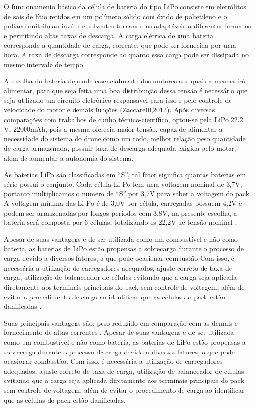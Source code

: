 
O funcionamento básico da célula de bateria do tipo LiPo consiste em eletrólitos de sais de lítio retidos
em um polímero sólido com óxido de polietileno e o poliacrilonitrilo ao invés de solventes tornando-as
adaptáveis a diferentes formatos e permitindo altas taxas de descarga. A carga elétrica de uma bateria
corresponde a quantidade de carga, corrente, que pode ser fornecida por uma hora. 
A taxa de descarga corresponde ao quanto essa carga pode ser dissipada no mesmo intervalo de tempo. \cite{gibbs}

A escolha da bateria depende essencialmente dos motores aos quais a mesma irá alimentar, para que seja feita uma boa distribuição dessa tensão é necessário que seja utilizado um circuito eletrônico responsável para isso e pelo controle de velocidade do motor e demais funções (Zaccarelli,2012). Após diversas comparações com trabalhos de cunho técnico-científico, optou-se pela  LiPo 22.2 V, 22000mAh, pois a mesma oferecia maior tensão, capaz de alimentar a necessidade do sistema do drone como um todo, melhor relação peso quantidade de carga armazenada, possuir taxa de descarga adequada exigida pelo motor, além de aumentar a autonomia do sistema.

As baterias LiPo são classificadas em “S”, tal fator significa quantas baterias em série possui o conjunto. Cada célula Li-Po tem uma voltagem nominal de 3,7V, portanto multiplicamos o numero de “S” por 3,7V para saber a voltagem do pack.  A voltagem mínima das Li-Po é de 3,0V por célula, carregadas possuem 4,2V e podem ser armazenadas por longos períodos com 3,8V, na presente escolha, a bateria será composta por 6 células, totalizando os 22,2V de tensão nominal \cite{gibbs}.

Apesar de suas vantagens e de ser utilizada como um combustível e não como bateria, as baterias de LiPo estão propensas a sobrecarga durante o processo de carga devido a diversos fatores, o que pode ocasionar combustão Com isso, é necessária a utilização de carregadores adequados, ajuste correto de taxa de carga, utilização de balanceador de células evitando que a carga seja aplicada diretamente aos terminais principais do pack sem controle de voltagem, além de evitar o procedimento de carga ao identificar que as células do pack estão danificadas \cite{gibbs}.

Suas principais vantagens são: peso reduzido em comparação com as demais e fornecimento de altas correntes 
\cite{pinto}. Apesar de suas vantagens e de ser utilizada como um combustível e não como bateria,
as baterias de LiPo estão propensas a sobrecarga durante o processo de carga devido a diversos fatores, 
o que pode ocasionar combustão. Com isso, é necessária a utilização de carregadores adequados, ajuste correto 
de taxa de carga, utilização de balanceador de células evitando que a carga seja aplicada diretamente aos 
terminais principais do pack sem controle de voltagem, além de evitar o procedimento de carga ao identificar 
que as células do pack estão danificadas. \cite{gibbs}

